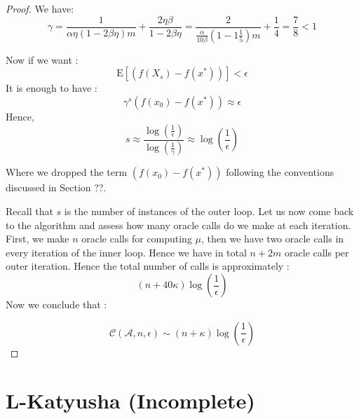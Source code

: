 \documentclass[12pt]{report}
\newcommand{\E}{\mathrm{E}}
\begin{document}
\begin{proof}
We have:
$$\gamma=\frac{1}{\alpha\eta(1-2\beta\eta)m}+\frac{2\eta\beta}{1-2\beta\eta}=\frac{2}{\frac{\alpha}{10\beta}(1-1\frac{1}{5})m}+\frac{1}{4}=\frac{7}{8}<1$$


Now if we want : $$\E[\left(f({X}_s)-f(x^*)\right)]<\epsilon $$
It is enough to have : 
$$\gamma^s \left(f({x}_{0})-f(x^*)\right)\approx \epsilon$$
Hence, $$s \approx \frac{\log(\frac{1}{\epsilon})}{\log(\frac{1}{\gamma})} \approx {\log\left(\frac{1}{\epsilon}\right)}$$

Where we dropped the term $\left(f({x}_{0})-f(x^*)\right)$  following the conventions discussed in Section ??.

Recall that $s$ is the number of instances of the outer loop. Let us now come back to the algorithm and assess how many oracle calls do we make at each iteration. First, we make $n$ oracle calls for computing $\mu$, then we have two oracle calls in every iteration of the inner loop. Hence we have in total $n+2m$ oracle calls per outer iteration.
Hence the total number of calls is approximately :
$$(n+40\kappa) {\log\left(\frac{1}{\epsilon}\right)}$$
Now we conclude that :

$$ \mathcal{C}(\mathcal{A},n,\epsilon)\sim \left(n+\kappa \right)\log\left(\frac{1}{\epsilon}\right)$$


\end{proof}

\chapter{L-Katyusha  (Incomplete)}
\end{document}
